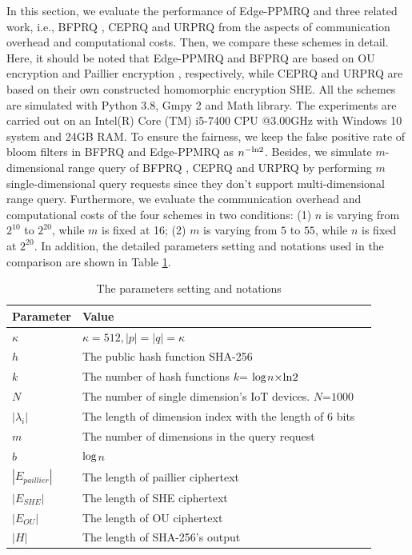 \documentclass[IEEE JOURNAL OF BIOMEDICAL AND HEALTH INFORMATICS]{IEEEtran}
\begin{document}
In this section, we evaluate the performance of Edge-PPMRQ and three related work, i.e., BFPRQ \cite{mahdikhani2020IoT}, CEPRQ \cite{hasan2020IoT} and URPRQ \cite{mahdikhani2020using} from the aspects of communication overhead and computational costs. Then, we compare these schemes in detail. Here, it should be noted that Edge-PPMRQ and BFPRQ \cite{mahdikhani2020IoT} are based on OU encryption \cite{ou1998} and Paillier encryption \cite{paillier1999}, respectively, while CEPRQ \cite{hasan2020IoT} and URPRQ \cite{mahdikhani2020using} are based on their own constructed homomorphic encryption SHE. All the schemes are simulated with Python 3.8, Gmpy 2 and Math library. The experiments are carried out on an Intel(R) Core (TM) i5-7400 CPU @3.00GHz with Windows 10 system and 24GB RAM. To ensure the fairness, we keep the false positive rate of bloom filters in BFPRQ \cite{mahdikhani2020IoT} and Edge-PPMRQ as $n^{-\rm{ln}2}$. Besides, we simulate $m$-dimensional range query of BFPRQ \cite{mahdikhani2020IoT}, CEPRQ \cite{hasan2020IoT} and URPRQ \cite{mahdikhani2020using} by performing $m$ single-dimensional query requests since they don't support multi-dimensional range query. Furthermore, we evaluate the communication overhead and computational costs of the four schemes in two conditions: (1) $n$ is varying from $2^{10}$ to $2^{20}$, while $m$ is fixed at 16; (2) $m$ is varying from $5$ to $55$, while $n$ is fixed at $2^{20}$. In addition, the detailed parameters setting and notations used in the comparison are shown in Table \ref{parameters table}.

\begin{table}
\centering\caption{The parameters setting and notations}
\label{parameters table}
\begin{tabular}{lll}                                                 
\hline
Parameter & Value \\
\hline
$\kappa$ & $\kappa=512, |p|=|q|=\kappa$\\
$h$ &The public hash function SHA-256\\
$k$ &The number of hash functions $k$= $\rm{log}$$n$$ \times\rm{ln}2$ \\
$N$ &The number of single dimension's IoT devices. $N$=$1000$ \\
$|\lambda_i|$ & The length of dimension index with the length of $6$ bits\\
$m$ & The number of dimensions in the query request\\
$b$ & $\rm{log}$$n$\\
$|E_{paillier}|$ & The length of paillier ciphertext\\
$|E_{SHE}|$ & The length of SHE ciphertext\\
$|E_{OU}|$ & The length of OU ciphertext\\
$|H|$ & The length of SHA-256's output\\
\hline
\end{tabular}
\end{table}
\end{document}

